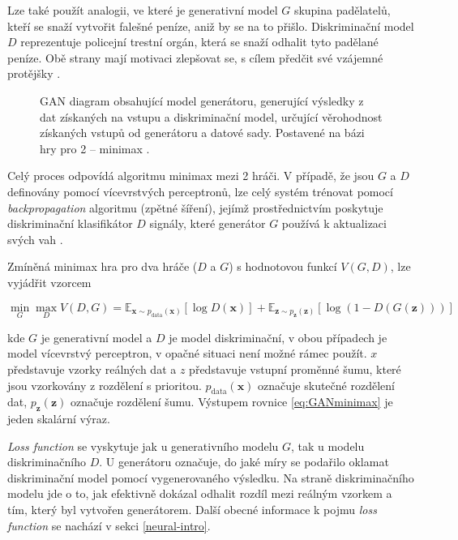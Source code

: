 Lze také použít analogii, ve které je generativní model $G$ skupina padělatelů, kteří se snaží vytvořit falešné peníze, aniž by se na to přišlo. Diskriminační model $D$ reprezentuje policejní trestní orgán, která se snaží odhalit tyto padělané peníze. Obě strany mají motivaci zlepšovat se, s cílem předčit své vzájemné protějšky \cite{goodfellow2014generative}\cite{GANgoogle}.

\begin{figure}[H]
	\centering
	
	\caption{GAN diagram obsahující model generátoru, generující výsledky z dat získaných na vstupu a diskriminační model, určující věrohodnost získaných vstupů od generátoru a datové sady. Postavené na bázi hry pro 2 -- minimax \cite{GANgoogle}.}
        \label{fig:GAN}
\end{figure}

\noindent Celý proces odpovídá algoritmu minimax mezi 2 hráči. V případě, že jsou $G$ a $D$ definovány pomocí vícevrstvých perceptronů, lze celý systém trénovat pomocí \textit{backpropagation} algoritmu (zpětné šíření), jejímž prostřednictvím poskytuje diskriminační klasifikátor $D$ signály, které generátor $G$ používá k aktualizaci svých vah \cite{goodfellow2014generative}\cite{GANgoogle}. 

Zmíněná minimax hra pro dva hráče ($D$ a $G$) s hodnotovou funkcí $V(G, D)$, lze vyjádřit vzorcem

\begin{equation}
    \min_G \max_D V(D, G) = \mathbb{E}_{\mathbf{x} \sim p_{\text{data}}(\mathbf{x})} [\log D(\mathbf{x})] + \mathbb{E}_{\mathbf{z} \sim p_\mathbf{z}(\mathbf{z})} [\log(1 - D(G(\mathbf{z})))]
    \label{eq:GANminimax}
\end{equation}

kde $G$ je generativní model a $D$ je model diskriminační, v obou případech je model vícevrstvý perceptron, v opačné situaci není možné rámec použít. $x$ představuje vzorky reálných dat a $z$ představuje vstupní proměnné šumu, které jsou vzorkovány z rozdělení s prioritou. $p_{\text{data}}(\mathbf{x})$ označuje skutečné rozdělení dat, $p_\mathbf{z}(\mathbf{z})$ označuje rozdělení šumu. Výstupem rovnice \eqref{eq:GANminimax} je jeden skalární výraz.

\textit{Loss function} se vyskytuje jak u generativního modelu $G$, tak u modelu diskriminačního $D$. U generátoru označuje, do jaké míry se podařilo oklamat diskriminační model pomocí vygenerovaného výsledku. Na straně diskriminačního modelu jde o to, jak efektivně dokázal odhalit rozdíl mezi reálným vzorkem a tím, který byl vytvořen generátorem. Další obecné informace k pojmu \textit{loss function} se nachází v sekci \ref{neural-intro}.

